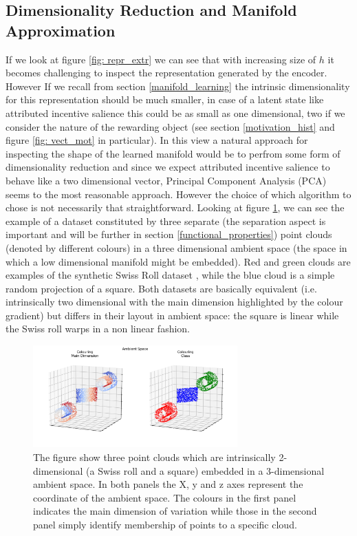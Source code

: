 \subsection{Dimensionality Reduction and Manifold Approximation}
\label{dim_reduction}
If we look at figure \ref{fig: repr_extr} we can see that with increasing size of $h$ it becomes challenging to inspect the representation generated by the encoder. However If we recall from section \ref{manifold_learning} the intrinsic dimensionality for this representation should be much smaller, in case of a latent state like attributed incentive salience this could be as small as one dimensional, two if we consider the nature of the rewarding object (see section \ref{motivation_hist} and figure \ref{fig: vect_mot} in particular). In this view a natural approach for inspecting the shape of the learned manifold would be to perfrom some form of dimensionality reduction and since we expect attributed incentive salience to behave like a two dimensional vector, Principal Component Analysis (PCA) \cite{pearson1901liii} seems to  the most reasonable approach. However the choice of which algorithm to chose is not necessarily that straightforward. Looking at figure \ref{fig: swiss_ambient}, we can see the example of a dataset constituted by three separate (the separation aspect is important and will be further in section \ref{functional_properties}) point clouds (denoted by different colours) in a three dimensional ambient space (the space in which a low dimensional manifold might be embedded). Red and green clouds are examples of the synthetic Swiss Roll dataset \cite{scikit-learn}, while the blue cloud is a simple random projection of a square. Both datasets are basically equivalent (i.e. intrinsically two dimensional with the main dimension highlighted by the colour gradient) but differs in their layout in ambient space: the square is linear while the Swiss roll warps in a non linear fashion.
\begin{figure}[h]
  \centering
  \includegraphics[width=0.7\textwidth]{images/chapter_4/ambient.png}
    \caption[\textbf{Swiss rolls and square in ambient space}]{The figure show three point clouds which are intrinsically 2-dimensional (a Swiss roll and a square) embedded in a 3-dimensional ambient space. In both panels the X, y and z axes represent the coordinate of the ambient space. The colours in the first panel indicates the main dimension of variation while those in the second panel simply identify membership of points to a specific cloud.}
    \label{fig: swiss_ambient}
\end{figure}
